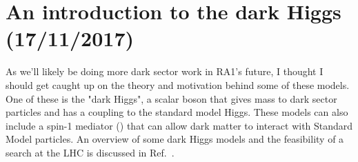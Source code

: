 
\chapter{An introduction to the dark Higgs (17/11/2017)}

As we'll likely be doing more dark sector work in RA1's future, I thought I should get caught up on the theory and motivation behind some of these models. One of these is the "dark Higgs", a scalar boson that gives mass to dark sector particles and has a coupling to the standard model Higgs. These models can also include a spin-1 mediator (\PZprime) that can allow dark matter to interact with Standard Model particles. An overview of some dark Higgs models and the feasibility of a search at the LHC is discussed in Ref.~\cite{Duerr:2017uap}.